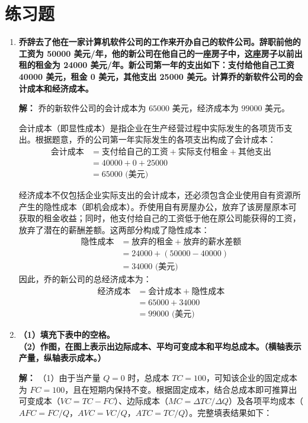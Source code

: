 	\section{练习题}
	\begin{enumerate}[label=\textbf{\arabic*.}, leftmargin=*]
		\item \textbf{乔辞去了他在一家计算机软件公司的工作来开办自己的软件公司。辞职前他的工资为 50000 美元/年，他的新公司在他自己的一座房子中，这座房子以前出租的租金为 24000 美元/年。新公司第一年的支出如下：支付给他自己工资 40000 美元，租金 0 美元，其他支出 25000 美元。计算乔的新软件公司的会计成本和经济成本。}
		
		\textbf{解：}
		乔的新软件公司的会计成本为 $65000$ 美元，经济成本为 $99000$ 美元。
		
		会计成本（即显性成本）是指企业在生产经营过程中实际发生的各项货币支出。根据题意，乔的公司第一年实际发生的各项支出构成了会计成本：
		\[
		\begin{aligned}
			\text{会计成本} &= \text{支付给自己的工资} + \text{实际支付租金} + \text{其他支出} \\
			&= 40000 + 0 + 25000 \\
			&= 65000 \text{ (美元)}
		\end{aligned}
		\]
		
		经济成本不仅包括企业实际支出的会计成本，还必须包含企业使用自有资源所产生的隐性成本（即机会成本）。乔使用自有房屋办公，放弃了该房屋原本可获取的租金收益；同时，他支付给自己的工资低于他在原公司能获得的工资，放弃了潜在的薪酬差额。这两部分构成了隐性成本：
		\[
		\begin{aligned}
			\text{隐性成本} &= \text{放弃的租金} + \text{放弃的薪水差额} \\
			&= 24000 + (50000 - 40000) \\
			&= 34000 \text{ (美元)}
		\end{aligned}
		\]
		因此，乔的新公司的总经济成本为：
		\[
		\begin{aligned}
			\text{经济成本} &= \text{会计成本} + \text{隐性成本} \\
			&= 65000 + 34000 \\
			&= 99000 \text{ (美元)}
		\end{aligned}
		\]
		\newpage
		\item \textbf{（1）填充下表中的空格。\\（2）作图，在图上表示出边际成本、平均可变成本和平均总成本。（横轴表示产量，纵轴表示成本。）}
		
		\textbf{解：}
		（1）由于当产量 $Q = 0$ 时，总成本 $TC = 100$，可知该企业的固定成本为 $FC = 100$，且在短期内保持不变。根据固定成本，结合总成本即可推算出可变成本（$VC = TC - FC$）、边际成本（$MC = \Delta TC / \Delta Q$）及各项平均成本（$AFC = FC/Q$，$AVC = VC/Q$，$ATC = TC/Q$）。完整填表结果如下：
		

\end{enumerate}
